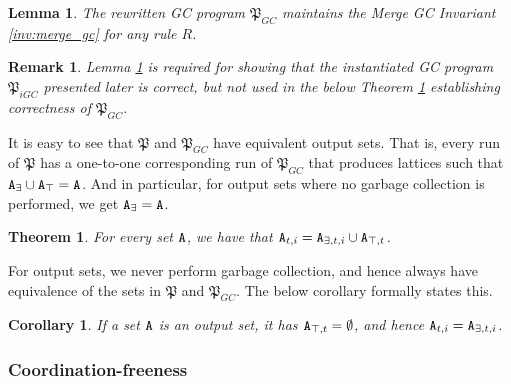 \documentclass{article}
\numberwithin{equation}{section}
\newtheorem{thm}[theorem]{Theorem}
\newtheorem{lemma}[theorem]{Lemma}
\newtheorem{cor}[theorem]{Corollary}
\newtheorem{rmk}{Remark}[section]
\renewcommand{\tt}[1]{\ifmmode\text{\texttt{#1}}\else\texttt{#1}\fi}
\begin{document}
\begin{lemma}
\label{lem:merge_gc_inv}
The rewritten GC program $\mathfrak{P}_{GC}$ maintains the Merge GC Invariant \ref{inv:merge_gc} for any rule $R$.
\end{lemma}


\begin{rmk}
Lemma \ref{lem:merge_gc_inv} is required for showing that the instantiated GC program $\mathfrak{P}_{iGC}$ presented later is correct, but not used in the below Theorem \ref{thm:equivalence_of_sets} establishing correctness of $\mathfrak{P}_{GC}$.
\end{rmk}




It is easy to see that $\mathfrak{P}$ and $\mathfrak{P}_{GC}$ have equivalent output sets.
That is, every run of $\mathfrak{P}$ has a one-to-one corresponding run of $\mathfrak{P}_{GC}$ that produces lattices such that $\tt{A}_\exists \cup \tt{A}_\top = \tt{A}$.
And in particular, for output sets where no garbage collection is performed, we get $\tt{A}_\exists = \tt{A}$.

\begin{thm}
\label{thm:equivalence_of_sets}
For every set $\tt{A}$, we have that $\tt{A}_{t,i} = \tt{A}_{\exists,t,i} \cup \tt{A}_{\top,t}$.
\end{thm}


For output sets, we never perform garbage collection, and hence always have equivalence of the sets in $\mathfrak{P}$ and $\mathfrak{P}_{GC}$.
The below corollary formally states this.
\begin{cor}
\label{cor:equivalence_of_output}
If a set $\tt{A}$ is an output set, it has $\tt{A}_{\top,t} = \emptyset$, and hence $\tt{A}_{t,i} = \tt{A}_{\exists,t,i}$.
\end{cor}



\subsubsection{Coordination-freeness}
\end{document}
